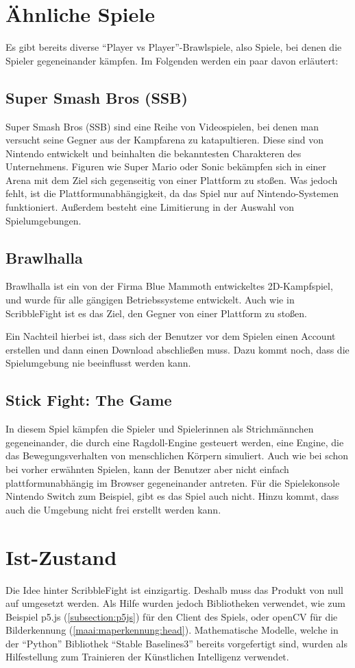 \section{Ähnliche Spiele}
Es gibt bereits diverse ``Player vs Player''-Brawlspiele, also Spiele, bei denen die Spieler gegeneinander kämpfen. Im Folgenden werden ein paar davon erläutert:

\subsection{Super Smash Bros (SSB)}
Super Smash Bros (SSB) sind eine Reihe von Videospielen, bei denen man versucht seine Gegner aus der Kampfarena zu katapultieren.
Diese sind von Nintendo entwickelt und beinhalten die bekanntesten Charakteren des Unternehmens.
Figuren wie Super Mario oder Sonic bekämpfen sich in einer Arena mit dem Ziel sich gegenseitig
von einer Plattform zu stoßen.
Was jedoch fehlt, ist die Plattformunabhängigkeit, da das Spiel nur auf Nintendo-Systemen funktioniert.
Außerdem besteht eine Limitierung in der Auswahl von Spielumgebungen.

\subsection{Brawlhalla} 
Brawlhalla ist ein von der Firma Blue Mammoth entwickeltes 2D-Kampfspiel, und wurde für alle gängigen Betriebssysteme entwickelt.
Auch wie in ScribbleFight ist es das Ziel, den Gegner von einer Plattform zu stoßen. \cite{brawlhalla}

Ein Nachteil hierbei ist, dass sich der Benutzer vor dem Spielen einen Account erstellen
und dann einen Download abschließen muss. Dazu kommt noch, dass die Spielumgebung nie beeinflusst werden kann.

\subsection{Stick Fight: The Game} 
In diesem Spiel kämpfen die Spieler und Spielerinnen als Strichmännchen gegeneinander, die durch eine Ragdoll-Engine gesteuert werden, eine Engine, die das Bewegungsverhalten von menschlichen Körpern simuliert.
Auch wie bei schon bei vorher erwähnten Spielen, kann der Benutzer aber nicht einfach plattformunabhängig im Browser gegeneinander antreten.
Für die Spielekonsole Nintendo Switch zum Beispiel, gibt es das Spiel auch nicht. Hinzu kommt, dass auch die Umgebung nicht frei erstellt werden kann. \cite{stickfight}

\section{Ist-Zustand}
Die Idee hinter ScribbleFight ist einzigartig. Deshalb muss das Produkt von null auf umgesetzt werden. Als Hilfe wurden jedoch Bibliotheken verwendet, wie zum Beispiel p5.js (\ref{subsection:p5js}) für den Client des Spiels, oder openCV für die Bilderkennung (\ref{maai:maperkennung:head}).
Mathematische Modelle, welche in der ``Python'' Bibliothek ``Stable Baselines3'' bereits vorgefertigt sind, wurden
als Hilfestellung zum Trainieren der Künstlichen Intelligenz verwendet.